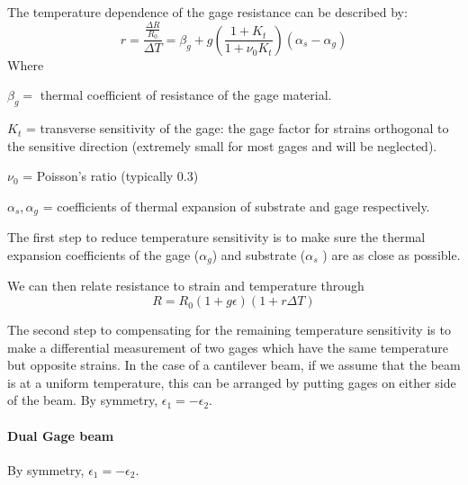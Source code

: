 The temperature dependence of the gage resistance can be described
by:
\[
r = \frac{\frac{\Delta R}{R_0}}{\Delta T} =
\beta_g + g \left (
    \frac{1+K_t}{1+\nu_0 K_t}
     \right )
     (\alpha_s - \alpha_g)
\]
Where

$\beta_g = $ thermal coefficient of resistance of the gage material.

$K_t$ = transverse sensitivity
 of the gage: the gage factor for strains	%
 orthogonal to the sensitive direction (extremely small for most	%
 gages and will be neglected).	%

$\nu_0$ = Poisson's ratio (typically 0.3)

$\alpha_s, \alpha_g$ = coefficients of thermal expansion of substrate and
gage respectively.

The first step to reduce temperature sensitivity is to make sure
the thermal expansion coefficients of the gage ($\alpha_g$)
and substrate ($\alpha_s$ ) are as close
as possible.

We can then relate resistance to strain and temperature through
\[
R = R_0(1+g\epsilon)(1+r\Delta T)
\]



The second step to compensating for the remaining temperature sensitivity
is to make a differential measurement of two gages which have the
same temperature but opposite strains.  In the case of a cantilever
beam, if we assume that the beam is at a uniform temperature, this
can be arranged by putting gages on either side of the beam. By
symmetry, $\epsilon_1 = -\epsilon_2$.

 \paragraph{Dual Gage beam}	%
By symmetry, $\epsilon_1 = -\epsilon_2$.


